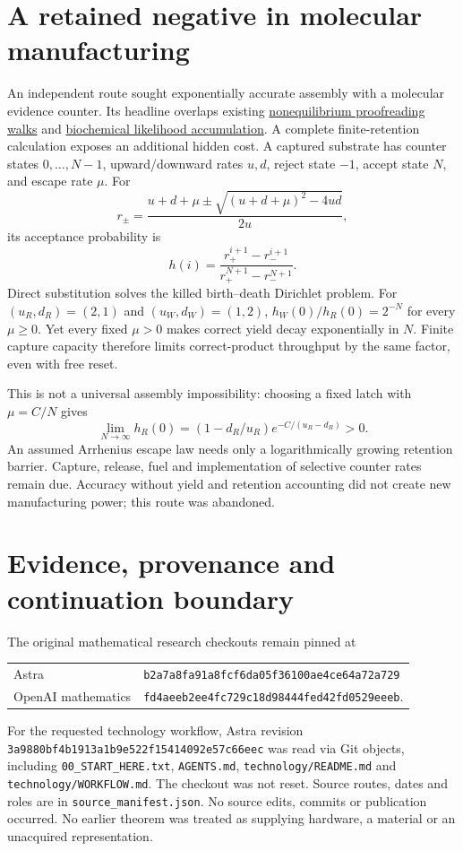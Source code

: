 \documentclass[11pt]{article}
\begin{document}
\section{A retained negative in molecular manufacturing}

An independent route sought exponentially accurate assembly with a molecular
evidence counter. Its headline overlaps existing
\href{https://doi.org/10.1073/pnas.1119911109}{nonequilibrium proofreading walks}
and \href{https://doi.org/10.1073/pnas.1314081110}{biochemical likelihood accumulation}.
A complete finite-retention calculation exposes an additional hidden cost.
A captured substrate has counter states $0,\ldots,N-1$, upward/downward rates
$u,d$, reject state $-1$, accept state $N$, and escape rate $\mu$.
For
\[
 r_\pm=\frac{u+d+\mu\pm\sqrt{(u+d+\mu)^2-4ud}}{2u},
\]
its acceptance probability is
\[
 h(i)=\frac{r_+^{i+1}-r_-^{i+1}}{r_+^{N+1}-r_-^{N+1}}.
\]
Direct substitution solves the killed birth--death Dirichlet problem.
For $(u_R,d_R)=(2,1)$ and $(u_W,d_W)=(1,2)$,
$h_W(0)/h_R(0)=2^{-N}$ for every $\mu\ge0$.
Yet every fixed $\mu>0$ makes correct yield decay exponentially in $N$.
Finite capture capacity therefore limits correct-product throughput by the
same factor, even with free reset.

This is not a universal assembly impossibility: choosing a fixed latch with
$\mu=C/N$ gives
\[
 \lim_{N\to\infty}h_R(0)
 =(1-d_R/u_R)e^{-C/(u_R-d_R)}>0.
\]
An assumed Arrhenius escape law needs only a logarithmically growing retention
barrier. Capture, release, fuel and implementation of selective counter rates
remain due. Accuracy without yield and retention accounting did not create
new manufacturing power; this route was abandoned.

\section{Evidence, provenance and continuation boundary}

The original mathematical research checkouts remain pinned at
\begin{center}\small
\begin{tabular}{ll}
Astra &\texttt{b2a7a8fa91a8fcf6da05f36100ae4ce64a72a729}\\
OpenAI mathematics &\texttt{fd4aeeb2ee4fc729c18d98444fed42fd0529eeeb}.
\end{tabular}
\end{center}
For the requested technology workflow, Astra revision
\texttt{3a9880bf4b1913a1b9e522f15414092e57c66eec} was read via Git objects,
including \texttt{00\_START\_HERE.txt}, \texttt{AGENTS.md},
\texttt{technology/README.md} and \texttt{technology/WORKFLOW.md}.
The checkout was not reset. Source routes, dates and roles are in
\texttt{source\_manifest.json}. No source edits, commits or publication occurred.
No earlier theorem was treated as supplying hardware, a material or an
unacquired representation.
\end{document}
